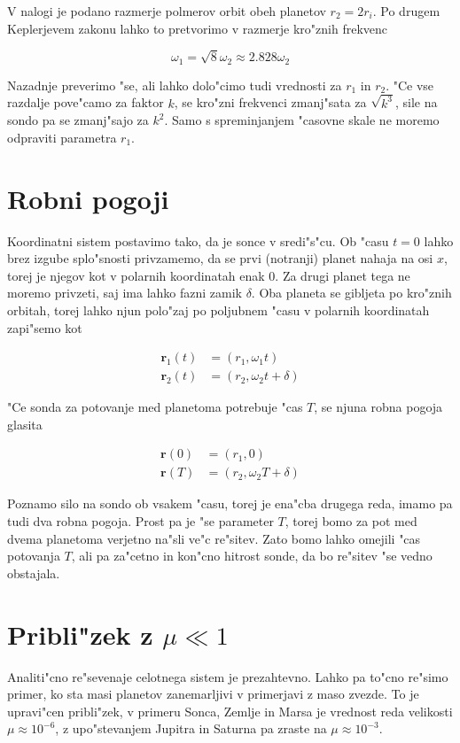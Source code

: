 \documentclass[a4paper,10pt]{article}
\renewcommand{\vec}{\mathbf}
\begin{document}
V nalogi je podano razmerje polmerov orbit obeh planetov $r_2 = 2r_i$. Po drugem Keplerjevem zakonu lahko to pretvorimo v razmerje kro"znih frekvenc

\[ \omega_1 = \sqrt{8}\omega_2 \approx 2.828 \omega_2 \]

Nazadnje preverimo "se, ali lahko dolo"cimo tudi vrednosti za $r_1$ in $r_2$. "Ce vse razdalje pove"camo za faktor $k$, se kro"zni frekvenci zmanj"sata za $\sqrt{k^3}$, sile na sondo pa se zmanj"sajo za $k^2$. Samo s spreminjanjem "casovne skale ne moremo odpraviti parametra $r_1$. 

\section{Robni pogoji}

Koordinatni sistem postavimo tako, da je sonce v sredi"s"cu. Ob "casu $t=0$ lahko brez izgube splo"snosti privzamemo, da se prvi (notranji) planet nahaja na osi $x$, torej je njegov kot v polarnih koordinatah enak 0. Za drugi planet tega ne moremo privzeti, saj ima lahko fazni zamik $\delta$. Oba planeta se gibljeta po kro"znih orbitah, torej lahko njun polo"zaj po poljubnem "casu v polarnih koordinatah zapi"semo kot

\begin{align}
 \vec r_1(t) &= (r_1, \omega_1 t) \\
 \vec r_2(t) &= (r_2, \omega_2 t + \delta)
\end{align}

"Ce sonda za potovanje med planetoma potrebuje "cas $T$, se njuna robna pogoja glasita

\begin{align}
 \vec r(0) &= (r_1, 0) \\
 \vec r(T) &= (r_2, \omega_2 T + \delta)
\end{align}

Poznamo silo na sondo ob vsakem "casu, torej je ena"cba drugega reda, imamo pa tudi dva robna pogoja. Prost pa je "se parameter $T$, torej bomo za pot med dvema planetoma verjetno na"sli ve"c re"sitev. Zato bomo lahko omejili "cas potovanja $T$, ali pa za"cetno in kon"cno hitrost sonde, da bo re"sitev "se vedno obstajala. 

\section{Pribli"zek z $\mu \ll 1$}

Analiti"cno re"sevenaje celotnega sistem je prezahtevno. Lahko pa to"cno re"simo primer, ko sta masi planetov zanemarljivi v primerjavi z maso zvezde. To je upravi"cen pribli"zek, v primeru Sonca, Zemlje in Marsa je vrednost reda velikosti $\mu \approx 10^{-6}$, z upo"stevanjem Jupitra in Saturna pa zraste na $\mu \approx 10^{-3}$. 
\end{document}
